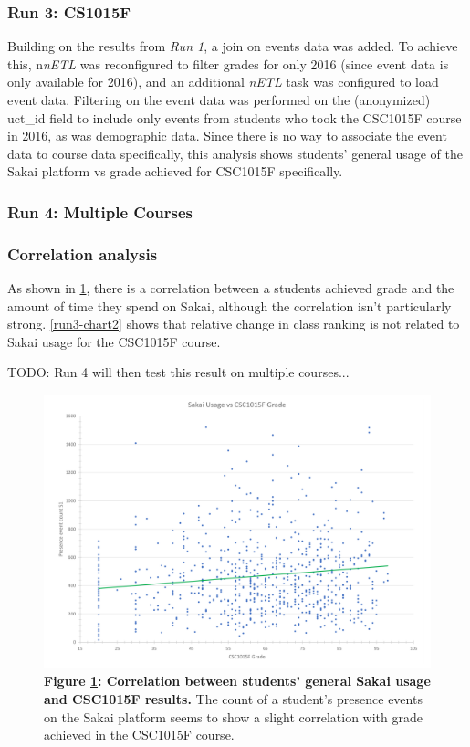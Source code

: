 \subsubsection{Run 3: CS1015F}
Building on the results from \textit{Run 1}, a join on events data was added. To achieve this, n\textit{nETL} was reconfigured to filter grades for only 2016 (since event data is only available for 2016), and an additional \textit{nETL} task was configured to load event data. Filtering on the event data was performed on the (anonymized) uct\_id field to include only events from students who took the CSC1015F course in 2016, as was demographic data. Since there is no way to associate the event data to course data specifically, this analysis shows students' general usage of the Sakai platform vs grade achieved for CSC1015F specifically.

\subsubsection{Run 4: Multiple Courses}

\subsubsection{Correlation analysis}
As shown in \ref{run3-chart1}, there is a correlation between a students achieved grade and the amount of time they spend on Sakai, although the correlation isn't particularly strong. \ref{run3-chart2} shows that relative change in class ranking is not related to Sakai usage for the CSC1015F course.

TODO: Run 4 will then test this result on multiple courses...


\begin{figure}[H]
    \centering
    \begin{mdframed}
        \centering
        \includegraphics[scale=0.55]{./resources/figures/run3-chart1.png}
    \end{mdframed}
    \caption[CSC1015 grade vs general Sakai usage]{\textbf{Figure \ref{run3-chart1}: Correlation between students' general Sakai usage and CSC1015F results.} The count of a student's presence events on the Sakai platform seems to show a slight correlation with grade achieved in the CSC1015F course.}
    \label{run3-chart1}
\end{figure}

